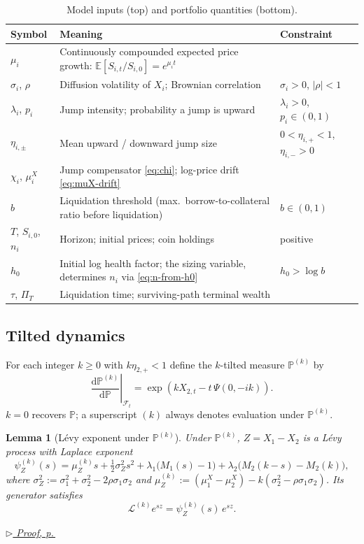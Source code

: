 \documentclass[11pt]{article}
\newcommand{\proofref}[1]{%
  \par\noindent\hfill{\small\itshape\hyperref[#1]{$\triangleright$ Proof, p.\,\pageref{#1}}}}
\newcommand{\E}{\mathbb{E}}
\renewcommand{\P}{\mathbb{P}}
\newcommand{\diff}{\mathrm{d}}
\newcommand{\F}{\mathcal{F}}
\theoremstyle{plain}
\newtheorem{lemma}[theorem]{Lemma}
\theoremstyle{definition}
\theoremstyle{remark}
\begin{document}
\begin{table}[ht]
\centering\small
\renewcommand{\arraystretch}{1.2}
\begin{tabularx}{\linewidth}{l X l}
\hline
Symbol & Meaning & Constraint \\
\hline
$\mu_i$ & Continuously compounded expected price growth: $\E[S_{i,t}/S_{i,0}]=e^{\mu_i t}$ & \\
$\sigma_i$, $\rho$ & Diffusion volatility of $X_i$; Brownian correlation & $\sigma_i>0$, $|\rho|<1$ \\
$\lambda_i$, $p_i$ & Jump intensity; probability a jump is upward & $\lambda_i>0$, $p_i\in(0,1)$ \\
$\eta_{i,\pm}$ & Mean upward / downward jump size & $0<\eta_{i,+}<1$, $\eta_{i,-}>0$ \\
$\chi_i$, $\mu_i^X$ & Jump compensator \eqref{eq:chi}; log-price drift \eqref{eq:muX-drift} & \\
\hline
$b$ & Liquidation threshold (max.\ borrow-to-collateral ratio before liquidation) & $b\in(0,1)$ \\
$T$, $S_{i,0}$, $n_i$ & Horizon; initial prices; coin holdings & positive \\
$h_0$ & Initial log health factor; the sizing variable, determines $n_i$ via \eqref{eq:n-from-h0} & $h_0>\log b$ \\
$\tau$, $\Pi_T$ & Liquidation time; surviving-path terminal wealth & \\
\hline
\end{tabularx}
\caption{Model inputs (top) and portfolio quantities (bottom).}
\label{tab:params}
\end{table}

\subsection{Tilted dynamics}\label{sec:tilted}

For each integer $k\ge 0$ with $k\eta_{2,+}<1$ define the $k$-tilted measure $\P^{(k)}$ by
\[
\left.\frac{\diff\P^{(k)}}{\diff\P}\right|_{\F_t}
=
\exp\!\left(kX_{2,t}-t\,\Psi(0,-ik)\right).
\]
$k=0$ recovers $\P$; a superscript $(k)$ always denotes evaluation under $\P^{(k)}$.
\begin{lemma}[L\'evy exponent under $\P^{(k)}$]\label{lem:psiZk}
Under $\P^{(k)}$, $Z=X_1-X_2$ is a L\'evy process with Laplace exponent
\begin{equation}\label{eq:psiZk}
\psi_Z^{(k)}(s)
=
\mu_Z^{(k)}s+\tfrac12\sigma_Z^2 s^2
+\lambda_1\big(M_1(s)-1\big)
+\lambda_2\big(M_2(k-s)-M_2(k)\big),
\end{equation}
where $\sigma_Z^2:=\sigma_1^2+\sigma_2^2-2\rho\sigma_1\sigma_2$ and
$\mu_Z^{(k)}:=(\mu_1^X-\mu_2^X)-k(\sigma_2^2-\rho\sigma_1\sigma_2)$. Its generator satisfies
\begin{equation}\label{eq:generator-eigen}
\mathcal{L}^{(k)}e^{sz}=\psi_Z^{(k)}(s)\,e^{sz}.
\end{equation}
\end{lemma}
\proofref{proof:lem:psiZk}
\end{document}
